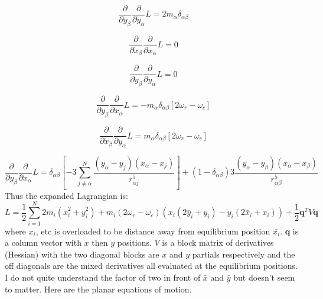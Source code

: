 \documentclass[12pt]{article}
\begin{document}
\begin{equation}
\frac{\partial }{\partial \dot{y}_{\beta}} \frac{\partial }{\partial \dot{y}_{\alpha}} L = 2m_{\alpha}\delta_{\alpha \beta} 
\end{equation}

\begin{equation}
\frac{\partial }{\partial \dot{x}_{\beta}} \frac{\partial }{\partial x_{\alpha}} L = 0
\end{equation}

\begin{equation}
\frac{\partial }{\partial \dot{y}_{\beta}} \frac{\partial }{\partial y_{\alpha}} L = 0
\end{equation}

\begin{equation}
\frac{\partial }{\partial \dot{y}_{\beta}} \frac{\partial }{\partial x_{\alpha}} L = - m_{\alpha}\delta_{\alpha \beta} \left[2\omega_r - \omega_c \right]
\end{equation}

\begin{equation}
\frac{\partial }{\partial \dot{x}_{\beta}} \frac{\partial }{\partial y_{\alpha}} L =  m_{\alpha}\delta_{\alpha \beta} \left[2\omega_r - \omega_c \right]
\end{equation}

\begin{equation}
\frac{\partial }{\partial y_{\beta}} \frac{\partial }{\partial x_{\alpha}} L =
\delta_{\alpha \beta} \left[  -3\sum^N_{j \neq \alpha}\frac{\left(y_{\alpha}-y_j \right)\left(x_{\alpha}-x_j \right)}{r^5_{\alpha j}} \right] + \left(1- \delta_{\alpha \beta} \right) 3\frac{\left(y_{\alpha}-y_{\beta} \right)\left(x_{\alpha}-x_{\beta} \right)}{r^5_{\alpha \beta}}
\end{equation}
Thus the expanded Lagrangian is:
\begin{equation}
L = \frac{1}{2}\sum^N_{i=1} 2m_i \left(\dot{x}_i^2 + \dot{y}_i^2 \right) +  m_i \left(2\omega_r - \omega_c \right) \left(\dot{x}_i(2 \bar{y}_i + y_i) - \dot{y}_i (2\bar{x}_i + x_i) \right) + \frac{1}{2}\mathbf{q}^T V \mathbf{q}
\end{equation}
where $x_i$, etc is overloaded to be distance away from equilibrium position $\bar{x_i}$. \textbf{q} is a column vector with $x$ then $y$ positions. $V$ is a block matrix of derivatives (Hessian) with the two diagonal blocks are $x$ and $y$ partials respectively and the off diagonals are the mixed derivatives all evaluated at the equilibrium positions. I do not quite understand the factor of two in front of $\bar{x}$ and $\bar{y}$ but doesn't seem to matter. Here are the planar equations of motion. 
\end{document}
